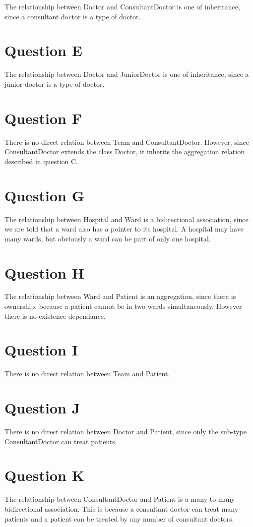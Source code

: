 \documentclass{article}
\begin{document}
The relationship between Doctor and ConsultantDoctor is one of inheritance, since a consultant doctor is a type of doctor.

\section*{Question E}

The relationship between Doctor and JuniorDoctor is one of inheritance, since a junior doctor is a type of doctor.

\section*{Question F}

There is no direct relation between Team and ConsultantDoctor. However, since ConsultantDoctor extends the class Doctor, it inherits the aggregation relation described in question C.

\section*{Question G}

The relationship between Hospital and Ward is a bidirectional association, since we are told that a ward also has a pointer to its hospital. A hospital may have many wards, but obviously a ward can be part of only one hospital.

\section*{Question H}

The relationship between Ward and Patient is an aggregation, since there is ownership, because a patient cannot be in two wards simultaneously. However there is no existence dependance.

\section*{Question I}

There is no direct relation between Team and Patient.

\section*{Question J}

There is no direct relation between Doctor and Patient, since only the sub-type ConsultantDoctor can treat patients.

\section*{Question K}

The relationship between ConsultantDoctor and Patient is a many to many bidirectional association. This is because a consultant doctor can treat many patients and a patient can be treated by any number of consultant doctors.
\end{document}
